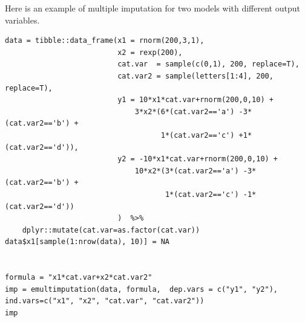 \documentclass[a4paper]{article}
\begin{document}
Here is an example of multiple imputation for two models with different output variables.

\lstset{numbers=left,language=r,label= ,caption= ,captionpos=b}
\begin{lstlisting}
data = tibble::data_frame(x1 = rnorm(200,3,1),
                          x2 = rexp(200),
                          cat.var  = sample(c(0,1), 200, replace=T),
                          cat.var2 = sample(letters[1:4], 200, replace=T),
                          y1 = 10*x1*cat.var+rnorm(200,0,10) +
                              3*x2*(6*(cat.var2=='a') -3*(cat.var2=='b') +
                                    1*(cat.var2=='c') +1*(cat.var2=='d')),
                          y2 = -10*x1*cat.var+rnorm(200,0,10) +
                              10*x2*(3*(cat.var2=='a') -3*(cat.var2=='b') +
                                     1*(cat.var2=='c') -1*(cat.var2=='d'))
                          )  %>%
    dplyr::mutate(cat.var=as.factor(cat.var)) 
data$x1[sample(1:nrow(data), 10)] = NA


formula = "x1*cat.var+x2*cat.var2"
imp = emultimputation(data, formula,  dep.vars = c("y1", "y2"), ind.vars=c("x1", "x2", "cat.var", "cat.var2"))
imp

\end{lstlisting}
\end{document}
